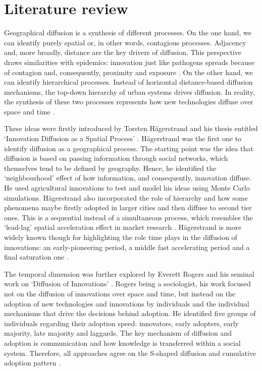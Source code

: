 \documentclass[
  authoryear,
  preprint,
  3p]{elsarticle}
\begin{document}
\section{Literature review}\label{sec2}

Geographical diffusion is a synthesis of different processes. On the one
hand, we can identify purely spatial or, in other words, contagious
processes. Adjacency and, more broadly, distance are the key drivers of
diffusion. This perspective draws similarities with epidemics:
innovation just like pathogens spreads because of contagion and,
consequently, proximity and exposure \citep{hivner2003facilitating}. On
the other hand, we can identify hierarchical processes. Instead of
horizontal distance-based diffusion mechanisms, the top-down hierarchy
of urban systems drives diffusion. In reality, the synthesis of these
two processes represents how new technologies diffuse over space and
time \citep{morrill2020spatial}.

These ideas were firstly introduced by Torsten Hägerstrand and his
thesis entitled `Innovation Diffusion as a Spatial Process'
\citep{hagerstrand1968innovation}. Hägerstrand was the first one to
identify diffusion as a geographical process. The starting point was the
idea that diffusion is based on passing information through social
networks, which themselves tend to be defined by geography. Hence, he
identified the `neighbourhood' effect of how information, and
consequently, innovation diffuse. He used agricultural innovations to
test and model his ideas using Monte Carlo simulations. Hägerstrand also
incorporated the role of hierarchy and how some phenomena maybe firstly
adopted in larger cities and then diffuse to second tier ones. This is a
sequential instead of a simultaneous process, which resembles the
`lead-lag' spatial acceleration effect in market research
\citep{bento2018time, PERES201091}. Hägerstrand is more widely known
though for highlighting the role time plays in the diffusion of
innovations: an early-pioneering period, a middle fast accelerating
period and a final saturation one \citep{morrill2020spatial}.

The temporal dimension was further explored by Everett Rogers and his
seminal work on `Diffusion of Innovations' \citep{rogers2010diffusion}.
Rogers being a sociologist, his work focused not on the diffusion of
innovations over space and time, but instead on the adoption of new
technologies and innovations by individuals and the individual
mechanisms that drive the decisions behind adoption. He identified five
groups of individuals regarding their adoption speed: innovators, early
adopters, early majority, late majority and laggards. The key mechanism
of diffusion and adoption is communication and how knowledge is
transferred within a social system. Therefore, all approaches agree on
the S-shaped diffusion and cumulative adoption pattern
\citep{grubler1990rise}.
\end{document}
